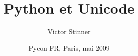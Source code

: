 \documentclass[handout]{beamer}
\title[Comprendre les erreurs Unicode]{Python et Unicode}
\author{Victor Stinner}
\date{Pycon FR, Paris, mai 2009}
\begin{document}
\begin{frame}
  \titlepage
\end{frame}






\end{document}
